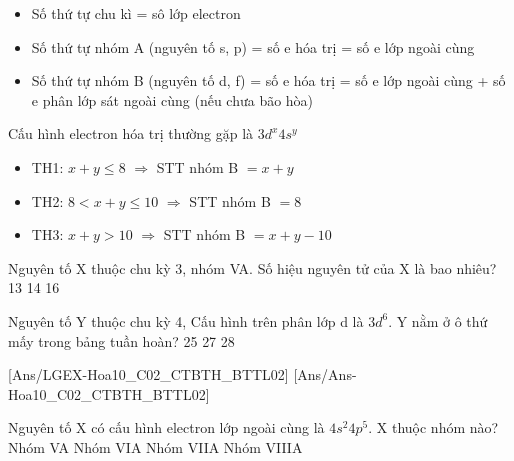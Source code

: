 \begin{pp}
	\begin{itemize}
		\item Số thứ tự chu kì = sô lớp electron
		\item Số thứ tự nhóm A (nguyên tố s, p)  = số e hóa trị = số e lớp ngoài cùng
		\item Số thứ tự nhóm B (nguyên tố d, f)  = số e hóa trị = số e lớp ngoài cùng + số e phân lớp sát ngoài cùng (nếu chưa bão hòa)
	\end{itemize}
	Cấu hình electron hóa trị thường gặp là $3d^x4s^y$
	\begin{itemize}
		\item TH1: $x+y \leq 8 $ $\Rightarrow $ STT nhóm B $=x+y$
		\item TH2: $ 8 <x+y \leq 10 $ $\Rightarrow $ STT nhóm B $=8$
		\item TH3: $x+y > 10 $ $\Rightarrow $ STT nhóm B $=x+y-10$
	\end{itemize}
\end{pp}
\begin{vdex}
	Nguyên tố X thuộc chu kỳ 3, nhóm VA. Số hiệu nguyên tử của X là bao nhiêu?
	\choice
	{13}
	{14}
	{}
	{16}
\end{vdex}
\begin{vdex}
	Nguyên tố Y thuộc chu kỳ 4, Cấu hình trên phân lớp d là $3d^6$. Y nằm ở ô thứ mấy trong bảng tuần hoàn?
	\choice
	{25}
	{}
	{27}
	{28}
\end{vdex}





[Ans/LGEX-Hoa10_C02_CTBTH_BTTL02]
[Ans/Ans-Hoa10_C02_CTBTH_BTTL02]
\hienthiloigiaiex
\begin{ex}
	Nguyên tố X có cấu hình electron lớp ngoài cùng là $4s^2 4p^5$. X thuộc nhóm nào?
	\choice
	{Nhóm VA}
	{Nhóm VIA}
	{\True Nhóm VIIA}
	{Nhóm VIIIA}
\end{ex}

